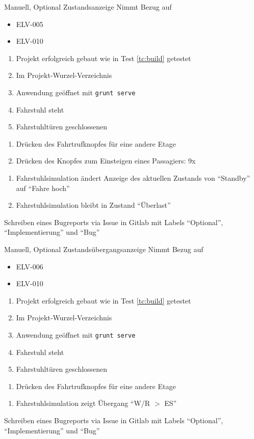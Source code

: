 \begin{testcase}{Manuell, Optional}
\tcSubject Zustandsanzeige
\tcRemark Nimmt Bezug auf
	\begin{itemize}
	\item ELV-005
	\item ELV-010
	\end{itemize}
\tcConditions
	\begin{enumerate}
	\item Projekt erfolgreich gebaut wie in Test \ref{tc:build} getestet
	\item Im Projekt-Wurzel-Verzeichnis
	\item Anwendung geöffnet mit \texttt{grunt serve}
	\item Fahrstuhl steht
	\item Fahrstuhltüren geschlossenen
	\end{enumerate}
\tcProceeding
	\begin{enumerate}
	\item Drücken des Fahrtrufknopfes für eine andere Etage
	\item Drücken des Knopfes zum Einsteigen eines Passagiers: 9x
	\end{enumerate}
\tcGoal
	\begin{enumerate}
		\item Fahrstuhlsimulation ändert Anzeige des aktuellen Zustands von "`Standby"' auf "`Fahre hoch"'
		\item Fahrstuhlsimulation bleibt in Zustand "`Überlast"'
	\end{enumerate}
\tcError Schreiben eines Bugreports via Issue in Gitlab mit Labels "`Optional"', "`Implementierung"' und "`Bug"'
\end{testcase}

\begin{testcase}{Manuell, Optional}
\tcSubject Zustandsübergangsanzeige
\tcRemark Nimmt Bezug auf
	\begin{itemize}
	\item ELV-006
	\item ELV-010
	\end{itemize}
\tcConditions
	\begin{enumerate}
	\item Projekt erfolgreich gebaut wie in Test \ref{tc:build} getestet
	\item Im Projekt-Wurzel-Verzeichnis
	\item Anwendung geöffnet mit \texttt{grunt serve}
	\item Fahrstuhl steht
	\item Fahrstuhltüren geschlossenen
	\end{enumerate}
\tcProceeding
	\begin{enumerate}
	\item Drücken des Fahrtrufknopfes für eine andere Etage
	\end{enumerate}
\tcGoal
	\begin{enumerate}
		\item Fahrstuhlsimulation zeigt Übergang "`W/R $>$ ES"'
	\end{enumerate}
\tcError Schreiben eines Bugreports via Issue in Gitlab mit Labels "`Optional"', "`Implementierung"' und "`Bug"'
\end{testcase}

